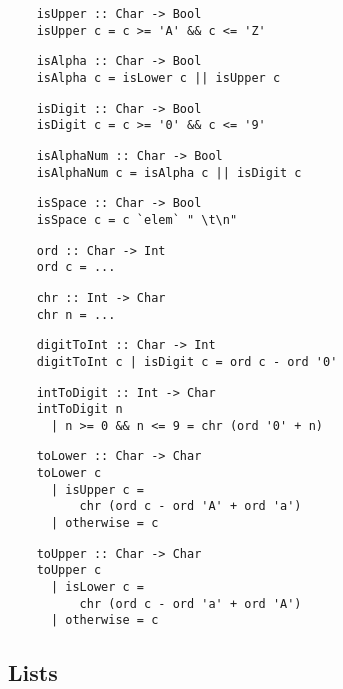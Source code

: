 \begin{multicols}{2}
	\begin{verbatim}
	isUpper :: Char -> Bool 
	isUpper c = c >= 'A' && c <= 'Z'
	\end{verbatim}
	
	\begin{verbatim}
	isAlpha :: Char -> Bool 
	isAlpha c = isLower c || isUpper c
	\end{verbatim}
	
	\begin{verbatim}
	isDigit :: Char -> Bool 
	isDigit c = c >= '0' && c <= '9'
	\end{verbatim}
	
	\begin{verbatim}
	isAlphaNum :: Char -> Bool 
	isAlphaNum c = isAlpha c || isDigit c
	\end{verbatim}
	
	\begin{verbatim}
	isSpace :: Char -> Bool 
	isSpace c = c `elem` " \t\n"
	\end{verbatim}
	
	\begin{verbatim}
	ord :: Char -> Int 
	ord c = ...
	\end{verbatim}
	
	\begin{verbatim}
	chr :: Int -> Char 
	chr n = ...
	\end{verbatim}
	
	\begin{verbatim}
	digitToInt :: Char -> Int 
	digitToInt c | isDigit c = ord c - ord '0'
	\end{verbatim}
	
	\begin{verbatim}
	intToDigit :: Int -> Char 
	intToDigit n 
	  | n >= 0 && n <= 9 = chr (ord '0' + n)
	\end{verbatim}
	
	\begin{verbatim}
	toLower :: Char -> Char 
	toLower c 
	  | isUpper c =
	      chr (ord c - ord 'A' + ord 'a')
	  | otherwise = c
	\end{verbatim}
	
	\begin{verbatim}
	toUpper :: Char -> Char 
	toUpper c 
	  | isLower c =
	      chr (ord c - ord 'a' + ord 'A')
	  | otherwise = c
	\end{verbatim}
	
	\subsection*{Lists}
	

\end{multicols}
